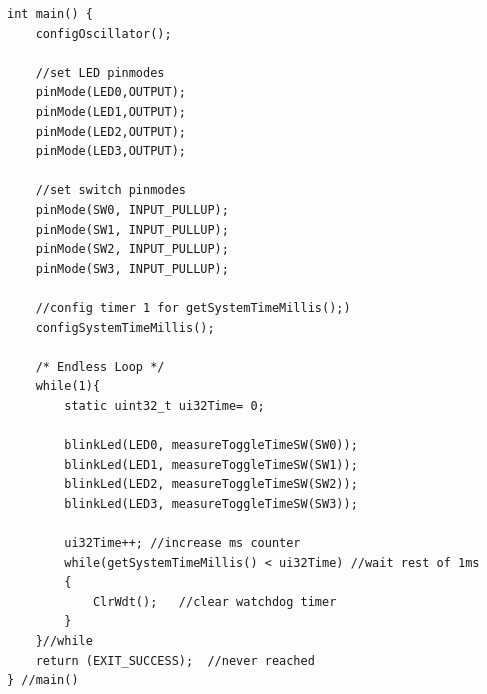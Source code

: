 \newpage
\begin{lstlisting}[frame=htrbl, caption={NonBlockingCode Main-Funktion}, label={lst:mainnonblocking}]
int main() {
	configOscillator();
	
	//set LED pinmodes
	pinMode(LED0,OUTPUT);
	pinMode(LED1,OUTPUT);
	pinMode(LED2,OUTPUT);
	pinMode(LED3,OUTPUT);
	
	//set switch pinmodes
	pinMode(SW0, INPUT_PULLUP);
	pinMode(SW1, INPUT_PULLUP);
	pinMode(SW2, INPUT_PULLUP);
	pinMode(SW3, INPUT_PULLUP);
	
	//config timer 1 for getSystemTimeMillis();)
	configSystemTimeMillis();
		
	/* Endless Loop */
	while(1){
		static uint32_t ui32Time= 0;
		
		blinkLed(LED0, measureToggleTimeSW(SW0));
		blinkLed(LED1, measureToggleTimeSW(SW1));
		blinkLed(LED2, measureToggleTimeSW(SW2));
		blinkLed(LED3, measureToggleTimeSW(SW3));
				
		ui32Time++; //increase ms counter
		while(getSystemTimeMillis() < ui32Time) //wait rest of 1ms
		{
			ClrWdt();   //clear watchdog timer
		}
	}//while
	return (EXIT_SUCCESS);  //never reached
} //main()
\end{lstlisting}

